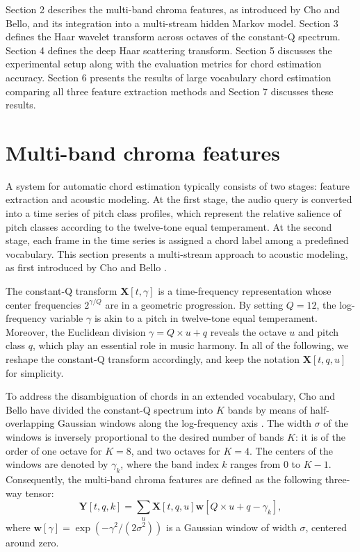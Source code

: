 \documentclass{article}
\begin{document}
Section 2 describes the multi-band chroma features, as
introduced by Cho and Bello, and its integration into a multi-stream
hidden Markov model.
Section 3 defines the Haar wavelet transform across octaves
of the constant-Q spectrum.
Section 4 defines the deep Haar scattering transform.
Section 5 discusses the experimental setup along with the evaluation metrics for chord estimation accuracy. Section 6 presents the results of large vocabulary chord estimation comparing all three feature extraction methods and Section 7 discusses these results.

\section{Multi-band chroma features}
A system for automatic chord estimation typically consists of two stages:
feature extraction and acoustic modeling.
At the first stage, the audio query is converted into a time series of
pitch class profiles, which represent the relative salience of
pitch classes according to the twelve-tone equal temperament.
At the second stage, each frame in the time series is assigned
a chord label among a predefined vocabulary.
This section presents a multi-stream approach to acoustic modeling,
as first introduced by Cho and Bello \cite{cho2013mirex}.

The constant-Q transform $\mathbf{X}[t, \gamma]$ is a time-frequency
representation whose center frequencies $2^{\gamma/Q}$ are in a geometric progression.
By setting $Q=12$, the log-frequency variable $\gamma$ is akin to a pitch in twelve-tone
equal temperament.
Moreover, the Euclidean division $\gamma = Q \times u + q$
reveals the octave $u$ and pitch class $q$,
which play an essential role in music harmony.
In all of the following, we reshape the constant-Q transform
accordingly, and keep the notation $\mathbf{X}[t, q, u]$ for simplicity.

To address the disambiguation of chords in an extended vocabulary,
Cho and Bello have divided the constant-Q spectrum into $K$
bands by means of half-overlapping Gaussian windows along
the log-frequency axis \cite{cho2013mirex}.
The width $\sigma$ of the windows is inversely proportional
to the desired number of bands $K$:
it is of the order of one octave for $K=8$,
and two octaves for $K=4$.
The centers of the windows are denoted by $\gamma_k$, where
the band index $k$ ranges from $0$ to $K-1$.
Consequently, the multi-band chroma features are defined as the following
three-way tensor:
\begin{equation}
\mathbf{Y}[t, q, k]
=
\sum_{u} 
\mathbf{X}[t, q, u]
\boldsymbol{w}[Q \times u + q - \gamma_k],
\end{equation}
where
$\boldsymbol{w}[\gamma] = \exp( - \gamma^2 / (2\sigma^2))$
is a Gaussian window of width $\sigma$, centered around zero.
\end{document}
